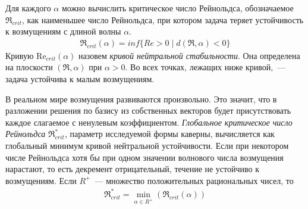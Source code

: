 Для каждого $\alpha$ можно вычислить критическое число Рейнольдса, обозначаемое $\Re_{crit}$, как наименьшее число Рейнольдса, при котором задача теряет устойчивость к возмущениям с длиной волны $\alpha$.
\begin{gather}
 \Re_{crit}(\alpha) = inf\{Re>0 \mid d(\Re,\alpha) < 0\}
\end{gather}
Кривую Re$_{crit}(\alpha)$ назовем \textit{кривой нейтральной стабильности}. Она определена на плоскости $(\Re,\alpha)$ при $\alpha > 0$. Во всех точках, лежащих ниже кривой,~--- задача устойчива к малым возмущениям. 

В реальном мире возмущения развиваются произвольно. Это значит, что в разложении решения по базису из собственных векторов будет присутствовать каждое слагаемое с ненулевым коэффициентом. 
\textit{Глобальное критическое число Рейнольдса} $\Re_{crit}^*$, параметр исследуемой формы каверны, вычисляется как глобальный минимум кривой нейтральной устойчивости. Если при некотором числе Рейнольдса хотя бы при одном значении волнового числа возмущения нарастают, то есть декремент отрицательный, течение не устойчиво к возмущениям. Если $R^+$~--- множество положительных рациональных чисел, то
\begin{gather}
 \Re_{crit}^* = \min_{\alpha \in R^+}(\Re_{crit}(\alpha))
\end{gather}


